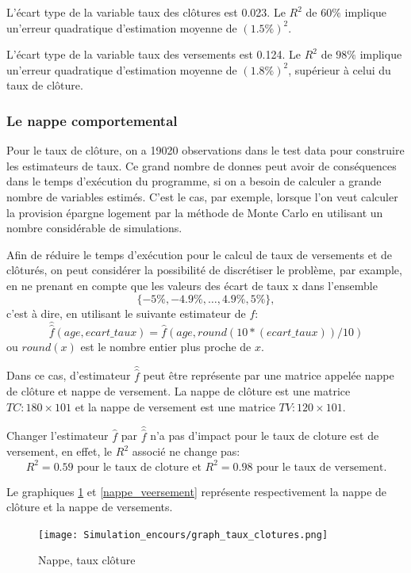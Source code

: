 \documentclass[12pt, a4paper]{book}
\begin{document}
L'écart type de la variable taux des clôtures est 0.023. Le $R^2$ de $60 \%$ implique un'erreur quadratique d'estimation moyenne de $(1.5 \%) ^ 2$.

L'écart type de la variable taux des versements est 0.124. Le $R^2$ de $98 \%$ implique un'erreur quadratique d'estimation moyenne de $(1.8 \%) ^ 2$, supérieur à celui du taux de clôture.

\subsubsection{Le nappe comportemental}

Pour le taux de clôture, on a 19020 observations dans le test data pour construire les estimateurs de taux. Ce grand nombre de donnes peut avoir de conséquences dans le temps d'exécution du programme, si on a besoin de calculer a grande nombre de variables estimés. C'est le cas, par exemple, lorsque l'on veut calculer la provision épargne logement par la méthode de Monte Carlo en utilisant un nombre considérable de simulations.

Afin de réduire le temps d'exécution pour le calcul de taux de versements et de clôturés, on peut considérer la possibilité de discrétiser le problème, par example, en ne prenant en compte que les valeurs des écart de taux  x dans l'ensemble
$$\{ -5\%, -4.9\%, \ldots, 4.9\%, 5\% \},$$
c'est à dire, en utilisant le suivante estimateur de $f$:
$$\hat{\hat{f}}(age, ecart\_taux)=\hat{f}(age,round(10*(ecart\_taux))/10) $$
ou $round(x)$ est le nombre entier plus proche de $x$.

Dans ce cas, d'estimateur $\hat{\hat{f}}$ peut être représente par une matrice appelée nappe de clôture et nappe de versement. La nappe de clôture est une matrice $TC: 180\times 101$ et la nappe de versement est une matrice $TV: 120\times 101$.

Changer l'estimateur $\hat{f}$ par $\hat{\hat{f}}$ n'a pas d'impact pour le taux de cloture est de versement, en effet, le $R^2$ associé ne change pas:
$$R^2 = 0.59 \mbox{ pour le taux de cloture et }R^2 = 0.98 \mbox{ pour le taux de versement}.$$

Le graphiques \ref{nappe_cloture} et \ref{nappe_veersement} représente respectivement la nappe de clôture et la nappe de versements. 

\begin{figure}[!h]
\label{nappe_cloture}
\centering
\texttt{[image: Simulation\_encours/graph\_taux\_clotures.png]}
\caption{Nappe, taux clôture }
\end{figure}
\end{document}
